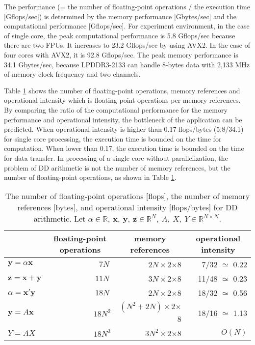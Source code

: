 \documentclass{IOS-Book-Article}
\begin{document}
The performance (= the number of floating-point operations / the execution time [Gflops/sec]) is determined by the memory performance [Gbytes/sec] and the computational performance [Gflops/sec].
For experiment environment, in the case of single core, the peak computational performance is 5.8 Gflops/sec because there are two FPUs. It increases to 23.2 Gflops/sec by using AVX2. In the case of four cores with AVX2, it is 92.8 Gflops/sec.
The peak memory performance is 34.1 Gbytes/sec, because LPDDR3-2133 can handle 8-bytes data with 2,133 MHz of memory clock frequency and two channels. 

Table \ref{opeData} shows the number of floating-point operations, memory references and operational intensity\cite{roof} which is floating-point operations per memory references. By comparing the ratio of the computational performance for the memory performance and operational intensity, the bottleneck of the application can be predicted\cite{roof}. When operational intensity is higher than 0.17 flops/bytes (5.8/34.1) for single core processing, the execution time is bounded on the time for computation. When lower than 0.17, the execution time is bounded on the time for data transfer. 
In processing of a single core without parallelization, the problem of DD arithmetic is not the number of memory references, but the number of floating-point operations, as shown in Table \ref{opeData}.

\begin{table}[htbp]
\centering
\footnotesize
\caption{The number of floating-point operations [flops], the number of memory references [bytes], and operational intensity [flops/bytes] for DD arithmetic. Let $ \alpha \in \mathbb{R},\ \bm{x},\ \bm{y},\ \bm{z}\in \mathbb{R}^{N},\ A,\ X,\ Y \in \mathbb{R}^{N\times N}$.}
\label{opeData}
\begin{tabular}{l||r|r|r}
\hline
    & \multicolumn{1}{c}{floating-point operations}   & \multicolumn{1}{|c|}{memory references}  & \multicolumn{1}{c}{operational intensity}                                    \\ \hline \hline
$\bm{y} = \alpha\bm{x}$ & $7N^{\ } $     & $2N \times 2$$\times$8      &7/32  $ \simeq$	0.22       \\ \hline
$\bm{z} = \bm{x} + \bm{y}$ & $11N^{\ } $     & $3N \times 2$$\times$8   &11/48  $\simeq$	0.23            \\ \hline
$\alpha  = \bm{x}'\bm{y}$& $18N^{\ }$    &$ 2N  \times 2$$\times$8           &18/32  $\simeq$	0.56          \\ \hline
$\bm{y} = A\bm{x}$ & $18N^2$ &$ (N^2+2N) \times 2$$\times$8 &18/16 $\simeq$	1.13 \\ \hline
$Y = AX$  & $18N^3$  & $3N^2 \times 2$$\times$8    &$O(N)$\\ \hline
\end{tabular}
\end{table}
\end{document}
